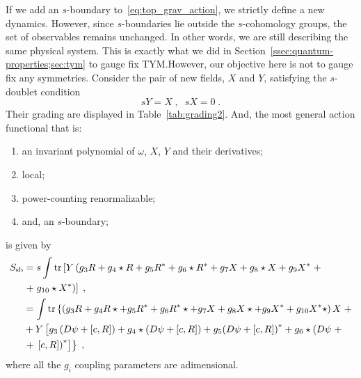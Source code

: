 \documentclass[../main.tex]{subfiles}
\begin{document}
If we add an $s$-boundary to~\eqref{eq:top_grav_action}, we strictly define a new dynamics. However, since $s$-boundaries lie outside the $s$-cohomology groups, the set of observables remains unchanged. In other words, we are still describing the same physical system. This is exactly what we did in Section~\ref{ssec:quantum-properties;sec:tym} to gauge fix TYM.\@ However, our objective here is not to gauge fix any symmetries. Consider the pair of new fields, $X$ and $Y$, satisfying the $s$-doublet condition
\begin{equation}
  \label{eq:s-doublet}
  sY = X \;, \;\; sX = 0 \;.
\end{equation}
Their grading are displayed in Table~\ref{tab:grading2}. And, the most general action functional that is:
\begin{enumerate}[label=\roman*)] %
  \item an invariant polynomial of $\omega$, $X$, $Y$ and their derivatives;
  \item local;
  \item power-counting renormalizable;
  \item  and, an $s$-boundary;
\end{enumerate}
is given by
\begin{subequations}%
  \label{eq:s-boundary_action}
  \begin{align}
    S_{\text{sb}} & = s \int \tr \left[ Y \left( g_3 R + g_4 \star R + g_5 R^* + g_6 \star R^* + g_7 X + g_8 \star X + g_9 X^* \right. + \right.                                                                \nonumber                                               \\
                  & \left. + \left. g_{10} \star X^* \right) \right] \;,                                                                                                                                                                                                \\
                  & = \int \tr \left\{ \left( g_3 R + g_4 R \star + g_5 R^* + g_6 R^* \star + g_7 X + g_8 X \star + g_9 X^* + g_{10} X^* \star \right) X \right. +                                                       \nonumber                                      \\
                  & + Y \left[ g_3 \left( D \psi + \left[ c , R \right] \right) + g_4 \star \left( D \psi + \left[ c , R \right] \right) + g_5 {\left( D \psi + \left[ c , R \right] \right)}^* + g_6 \star \left( D \psi \right. + \right.                   \nonumber \\
                  & \left. + \left. { \left. \left[ c , R \right] \right) }^* \right] \right\} \;,                                                                                                                                                                      %
  \end{align}
\end{subequations}
where all the $g_i$ coupling parameters are adimensional.
\end{document}
